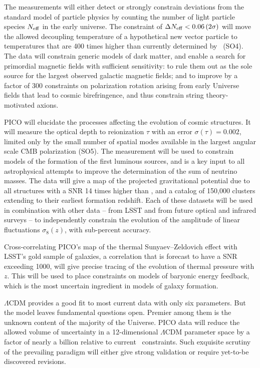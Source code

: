 \documentclass[PICOReport.tex]{subfiles}
\begin{document}
The measurements will either detect or strongly constrain deviations from the standard model of particle physics by counting the number of light particle species $N_{\rm eff}$ in the early universe.  The constraint of $\Delta N_{\rm eff} < 0.06 \, (2\sigma)$ will move the allowed decoupling temperature of a hypothetical new vector particle to temperatures that are 400 times higher than currently determined by \planck\ (SO4). The data will constrain generic models of dark matter, and enable a search for primordial magnetic fields with sufficient sensitivity: to rule them out as the sole source for the largest observed galactic magnetic fields; and to improve by a factor of 300 constraints on polarization rotation arising from early Universe fields that lead to cosmic birefringence, and thus constrain string theory-motivated axions. 

PICO will elucidate the processes affecting the evolution of cosmic structures. It will measure the optical depth to reionization $\tau$ with an error $\sigma(\tau) = 0.002$, limited only by the small number of spatial modes available in the largest angular scale CMB polarization (SO5). The measurement will be used to constrain models of the formation of the first luminous sources, and is a key input to all astrophysical attempts to improve the determination of the sum of neutrino masses. The data will give a map of the projected gravitational potential due to all structures with a \ac{SNR} 14 times higher than \planck , and a catalog of 150,000 clusters extending to their earliest formation redshift. Each of these datasets will be used in combination with other data -- from LSST and from future optical and infrared surveys -- to independently constrain the evolution of the amplitude of linear fluctuations $\sigma_{8}(z)$, with sub-percent accuracy.  

Cross-correlating PICO's map of the thermal Sunyaev--Zeldovich effect with LSST's gold sample of galaxies, a correlation that is forecast to have a \ac{SNR} exceeding 1000, will give precise tracing of the evolution of thermal pressure with $z$. This will be used to place constraints on models of baryonic energy feedback, which is the most uncertain ingredient in models of galaxy formation. 


$\Lambda$CDM provides a good fit to most current data with only six parameters. But the model leaves fundamental questions open. Premier among them is the unknown content of the majority of the Universe. PICO data will reduce the allowed volume of uncertainty in a 12-dimensional $ \Lambda$CDM parameter space by a factor of nearly a billion relative to current \planck\ constraints. Such exquisite scrutiny of the prevailing paradigm will either give strong validation or require yet-to-be discovered revisions.
\end{document}
